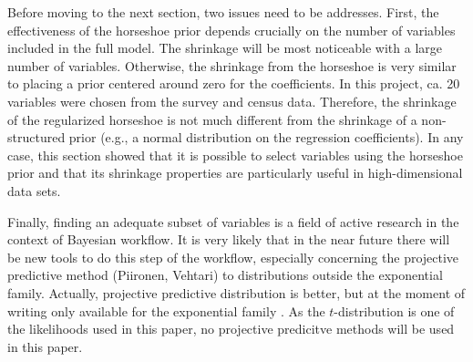 Before moving to the next section, two issues need to be addresses.
First, the effectiveness of the horseshoe prior depends crucially on the number of variables included in the full model.
The shrinkage will be most noticeable with a large number of variables.
Otherwise, the shrinkage from the horseshoe is very similar to placing a prior centered around zero for the coefficients.
In this project, ca. 20 variables were chosen from the survey and census data.
Therefore, the shrinkage of the regularized horseshoe is not much different from the shrinkage of a non-structured prior (e.g., a normal distribution on the regression coefficients).
In any case, this section showed that it is possible to select variables using the horseshoe prior and that its shrinkage properties are particularly useful in high-dimensional data sets.

Finally, finding an adequate subset of variables is a field of active research in the context of Bayesian workflow.
It is very likely that in the near future there will be new tools to do this step of the workflow, especially concerning the projective predictive method (Piironen, Vehtari) to distributions outside the exponential family.
Actually, projective predictive distribution is better, but at the moment of writing only available for the exponential family \citep{piironen_sparsity_2017}.
As the $t$-distribution is one of the likelihoods used in this paper, no projective predicitve methods will be used in this paper.
